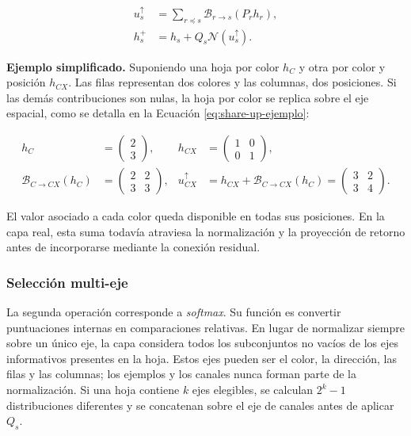 \documentclass[11pt,a4paper,spanish]{book}
\numberwithin{equation}{chapter}
\numberwithin{figure}{chapter}
\begin{document}
\begin{equation}\label{eq:share-up-operacion}
\begin{aligned}
u_s^{\uparrow}
    &=\sum_{r\preceq s}\mathcal{B}_{r\rightarrow s}(P_r h_r),\\
h_s^{+}
    &=h_s+Q_s\mathcal{N}\!\left(u_s^{\uparrow}\right).
\end{aligned}
\end{equation}

\textbf{Ejemplo simplificado.} Suponiendo una hoja por color \(h_C\) y otra por color y posición \(h_{CX}\). Las filas representan
dos colores y las columnas, dos posiciones. Si las demás contribuciones son nulas, la hoja por color se replica sobre el eje espacial,
como se detalla en la Ecuación \eqref{eq:share-up-ejemplo}:

\begin{equation}\label{eq:share-up-ejemplo}
\begin{aligned}
h_C&=\begin{pmatrix}2\\3\end{pmatrix},
&
h_{CX}&=\begin{pmatrix}1&0\\0&1\end{pmatrix},\\[2mm]
\mathcal{B}_{C\rightarrow CX}(h_C)
	&=\begin{pmatrix}2&2\\3&3\end{pmatrix},
&
u_{CX}^{\uparrow}
    &=h_{CX}+\mathcal{B}_{C\rightarrow CX}(h_C)
	  =\begin{pmatrix}3&2\\3&4\end{pmatrix}.
\end{aligned}
\end{equation}

El valor asociado a cada color queda disponible en todas sus posiciones. En la capa real, esta suma todavía atraviesa la normalización
y la proyección de retorno antes de incorporarse mediante la conexión residual.

\subsubsection{Selección multi-eje}

La segunda operación corresponde a \textit{softmax}. Su función es convertir puntuaciones internas en comparaciones relativas. En
lugar de normalizar siempre sobre un único eje, la capa considera todos los subconjuntos no vacíos de los ejes informativos presentes
en la hoja. Estos ejes pueden ser el color, la dirección, las filas y las columnas; los ejemplos y los canales nunca forman parte de
la normalización. Si una hoja contiene \(k\) ejes elegibles, se calculan \(2^k-1\) distribuciones diferentes y se concatenan sobre el
eje de canales antes de aplicar \(Q_s\).
\end{document}
